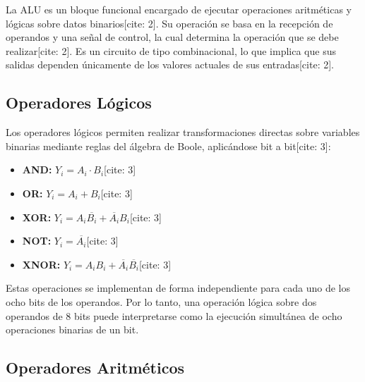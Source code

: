 \documentclass[12pt,a4paper]{article}
\begin{document}
La ALU es un bloque funcional encargado de ejecutar operaciones aritméticas y lógicas sobre datos binarios[cite: 2]. Su operación se basa en la recepción de operandos y una señal de control, la cual determina la operación que se debe realizar[cite: 2]. Es un circuito de tipo combinacional, lo que implica que sus salidas dependen únicamente de los valores actuales de sus entradas[cite: 2].

\subsection{Operadores Lógicos}

Los operadores lógicos permiten realizar transformaciones directas sobre variables binarias mediante reglas del álgebra de Boole, aplicándose bit a bit[cite: 3]:

\begin{itemize}
    \item \textbf{AND:} $Y_i = A_i \cdot B_i$[cite: 3]
    \item \textbf{OR:} $Y_i = A_i + B_i$[cite: 3]
    \item \textbf{XOR:} $Y_i = A_i \overline{B_i} + \overline{A_i} B_i$[cite: 3]
    \item \textbf{NOT:} $Y_i = \overline{A_i}$[cite: 3]
    \item \textbf{XNOR:} $Y_i = A_i B_i + \overline{A_i} \overline{B_i}$[cite: 3]
\end{itemize}

Estas operaciones se implementan de forma independiente para cada uno de los ocho bits de los operandos. Por lo tanto, una operación lógica sobre dos operandos de 8 bits puede interpretarse como la ejecución simultánea de ocho operaciones binarias de un bit.

\subsection{Operadores Aritméticos}
\end{document}
